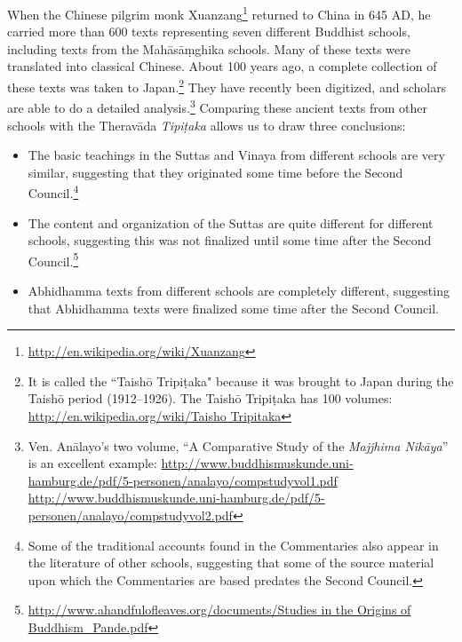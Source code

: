 When the Chinese pilgrim monk Xuanzang\footnote{\url{http://en.wikipedia.org/wiki/Xuanzang}} returned to China in 645 AD, he carried more than 600 texts representing seven different Buddhist schools, including texts from the Mahāsāṃghika schools. Many of these texts were translated into classical Chinese. About 100 years ago, a complete collection of these texts was taken to Japan.\footnote{It is called the “Taishō Tripiṭaka" because it was brought to Japan during the Taishō period (1912--1926). The Taishō Tripiṭaka has 100 volumes: \url{http://en.wikipedia.org/wiki/Taisho Tripitaka}} They have recently been digitized, and scholars are able to do a detailed analysis.\footnote{Ven. Anālayo’s two volume, “A Comparative Study of the \textit{Majjhima Nikāya}” is an excellent example: \newline \url{http://www.buddhismuskunde.uni-hamburg.de/pdf/5-personen/analayo/compstudyvol1.pdf} \newline \url{http://www.buddhismuskunde.uni-hamburg.de/pdf/5-personen/analayo/compstudyvol2.pdf}} Comparing these ancient texts from other schools with the Theravāda \textit{Tipiṭaka} allows us to draw three conclusions:

\begin{itemize}

\item The basic teachings in the Suttas and Vinaya from different schools are very similar, suggesting that they originated some time before the Second Council.\footnote{Some of the traditional accounts found in the Commentaries also appear in the literature of other schools, suggesting that some of the source material upon which the Commentaries are based predates the Second Council.}

\item The content and organization of the Suttas are quite different for different schools, suggesting this was not finalized until some time after the Second Council.\footnote{\url{http://www.ahandfulofleaves.org/documents/Studies in the Origins of Buddhism_Pande.pdf}}

\item Abhidhamma texts from different schools are completely different, suggesting that Abhidhamma texts were finalized some time after the Second Council.

\end{itemize}

\pagebreak

